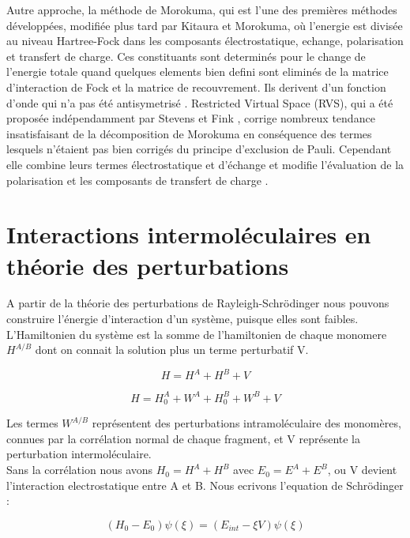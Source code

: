 Autre approche, la méthode de Morokuma, qui est l’une des premières méthodes développées, modifiée plus tard par Kitaura et Morokuma, où l'energie est divisée au niveau Hartree-Fock dans les composants  électrostatique, echange, polarisation et transfert de charge. Ces constituants sont determinés pour le change de l'energie totale quand quelques elements bien defini sont eliminés de la matrice d'interaction de Fock et la matrice de recouvrement. Ils derivent d'un fonction d'onde  qui n'a pas été antisymetrisé \cite{morokuma1977molecules}. Restricted Virtual Space (RVS), qui a été proposée indépendamment par Stevens et Fink \cite{stevens1987frozen}, corrige nombreux tendance insatisfaisant de la décomposition de Morokuma en conséquence des termes lesquels n’étaient pas bien corrigés du principe d’exclusion de Pauli. Cependant elle combine leurs termes électrostatique et d’échange et modifie l’évaluation de la polarisation et les composants de transfert de charge \cite{chen1996energy}.


\section{Interactions intermoléculaires en théorie des perturbations}


A partir de la théorie des perturbations de Rayleigh-Schr\"{o}dinger nous pouvons construire l'énergie d'interaction d'un système, puisque elles sont faibles. L'Hamiltonien du système est la somme de l'hamiltonien de chaque monomere $H^{A/B}$ dont on connait la solution plus un terme perturbatif V. 

\begin{equation}
H = H^{A} + H^{B} + V
\end{equation}

\begin{equation}
H = H_{0}^{A} + W^{A} + H_{0}^{B} + W^{B} + V
\end{equation}

Les termes $W^{A/B}$ représentent des perturbations intramoléculaire des monomères, connues par la corrélation normal de chaque fragment, et V représente la perturbation intermoléculaire.\\

Sans la corrélation nous avons $H_{0} = H^{A} + H^{B}$ avec $E_{0} = E^{A} + E^{B}$, ou V devient l'interaction electrostatique entre A et B. Nous ecrivons l'equation de Schr\"{o}dinger :

\begin{equation}
(H_{0} - E_{0}) \psi (\xi) = (E_{int} - \xi V) \psi (\xi)
\end{equation}

